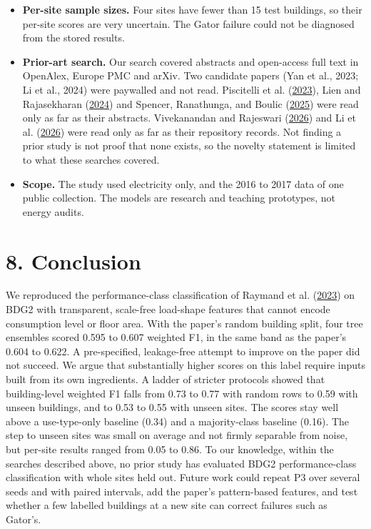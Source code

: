 \documentclass[
  10pt,
]{article}
\begin{document}
\begin{itemize}
\item
  \textbf{Per-site sample sizes.} Four sites have fewer than 15 test
  buildings, so their per-site scores are very uncertain. The Gator
  failure could not be diagnosed from the stored results.
\item
  \textbf{Prior-art search.} Our search covered abstracts and
  open-access full text in OpenAlex, Europe PMC and arXiv. Two candidate
  papers (Yan et al., 2023; Li et al., 2024) were paywalled and not
  read. Piscitelli et al.
  (\protect\hyperlink{ref-piscitelli2023}{2023}), Lien and Rajasekharan
  (\protect\hyperlink{ref-lien2024}{2024}) and Spencer, Ranathunga, and
  Boulic (\protect\hyperlink{ref-spencer2025}{2025}) were read only as
  far as their abstracts. Vivekanandan and Rajeswari
  (\protect\hyperlink{ref-vivekanandan2026}{2026}) and Li et al.
  (\protect\hyperlink{ref-li2026}{2026}) were read only as far as their
  repository records. Not finding a prior study is not proof that none
  exists, so the novelty statement is limited to what these searches
  covered.
\item
  \textbf{Scope.} The study used electricity only, and the 2016 to 2017
  data of one public collection. The models are research and teaching
  prototypes, not energy audits.
\end{itemize}

\hypertarget{conclusion}{%
\section{8. Conclusion}\label{conclusion}}

We reproduced the performance-class classification of Raymand et al.
(\protect\hyperlink{ref-raymand2023}{2023}) on BDG2 with transparent,
scale-free load-shape features that cannot encode consumption level or
floor area. With the paper's random building split, four tree ensembles
scored 0.595 to 0.607 weighted F1, in the same band as the paper's 0.604
to 0.622. A pre-specified, leakage-free attempt to improve on the paper
did not succeed. We argue that substantially higher scores on this label
require inputs built from its own ingredients. A ladder of stricter
protocols showed that building-level weighted F1 falls from 0.73 to 0.77
with random rows to 0.59 with unseen buildings, and to 0.53 to 0.55 with
unseen sites. The scores stay well above a use-type-only baseline (0.34)
and a majority-class baseline (0.16). The step to unseen sites was small
on average and not firmly separable from noise, but per-site results
ranged from 0.05 to 0.86. To our knowledge, within the searches
described above, no prior study has evaluated BDG2 performance-class
classification with whole sites held out. Future work could repeat P3
over several seeds and with paired intervals, add the paper's
pattern-based features, and test whether a few labelled buildings at a
new site can correct failures such as Gator's.
\end{document}
